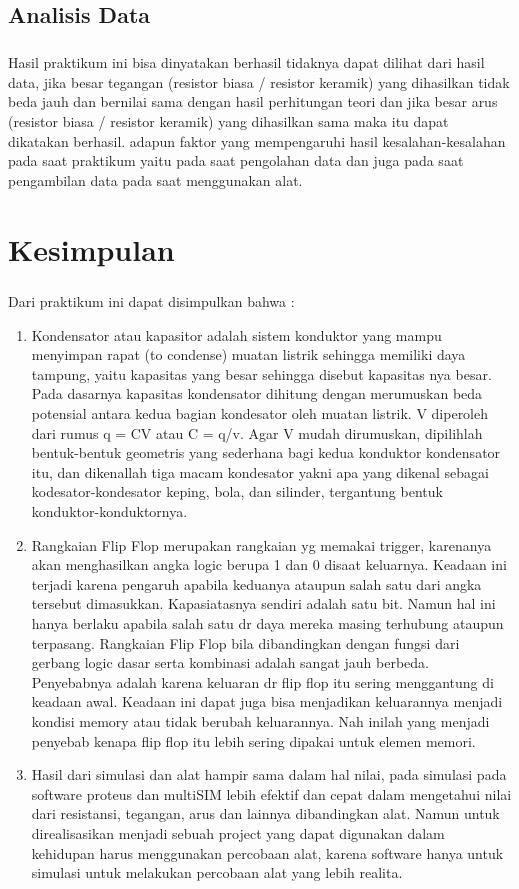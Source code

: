 \documentclass[12pt,a4paper]{article}
\begin{document}
\newpage
\subsection{Analisis Data}
\subparagraph{}
	Hasil praktikum ini bisa dinyatakan berhasil tidaknya dapat dilihat dari hasil data, jika besar tegangan (resistor biasa / resistor keramik) yang dihasilkan tidak beda jauh dan bernilai sama dengan hasil perhitungan teori dan jika besar arus (resistor biasa / resistor keramik) yang dihasilkan sama maka itu dapat dikatakan berhasil. adapun faktor yang mempengaruhi hasil kesalahan-kesalahan pada saat praktikum yaitu pada saat pengolahan data dan juga pada saat pengambilan data pada saat menggunakan alat.

\newpage
\section{Kesimpulan}
\subparagraph{ }
Dari praktikum ini dapat disimpulkan bahwa :
\begin{enumerate}

\item Kondensator atau kapasitor adalah sistem konduktor yang mampu menyimpan rapat (to condense) muatan listrik sehingga memiliki daya tampung, yaitu kapasitas yang besar sehingga disebut kapasitas nya besar. Pada dasarnya kapasitas kondensator dihitung dengan merumuskan beda potensial antara kedua bagian kondesator oleh muatan listrik. V diperoleh dari rumus q = CV atau C = q/v. Agar V mudah dirumuskan, dipilihlah bentuk-bentuk geometris yang sederhana bagi kedua konduktor kondensator itu, dan dikenallah tiga macam kondesator yakni apa yang dikenal sebagai kodesator-kondesator keping, bola, dan silinder, tergantung bentuk konduktor-konduktornya.

\item Rangkaian Flip Flop merupakan rangkaian yg memakai trigger, karenanya akan menghasilkan angka logic berupa 1 dan 0 disaat keluarnya. Keadaan ini terjadi karena pengaruh apabila keduanya ataupun salah satu dari angka tersebut dimasukkan. Kapasiatasnya sendiri adalah satu bit. Namun hal ini hanya berlaku apabila salah satu dr daya mereka masing terhubung ataupun terpasang. Rangkaian Flip Flop bila dibandingkan dengan fungsi dari gerbang logic dasar serta kombinasi adalah sangat jauh berbeda. Penyebabnya adalah karena keluaran dr flip flop itu sering menggantung di keadaan awal. Keadaan ini dapat juga bisa menjadikan keluarannya menjadi kondisi memory atau tidak berubah keluarannya. Nah inilah yang menjadi penyebab kenapa flip flop itu lebih sering dipakai untuk elemen memori.

\item Hasil dari simulasi dan alat hampir sama dalam hal nilai, pada simulasi pada software proteus dan multiSIM lebih efektif dan cepat dalam mengetahui nilai dari resistansi, tegangan, arus dan lainnya dibandingkan alat. Namun untuk direalisasikan menjadi sebuah project yang dapat digunakan dalam kehidupan harus menggunakan percobaan alat, karena software hanya untuk simulasi untuk melakukan percobaan alat yang lebih realita.


\end{enumerate}
\end{document}
